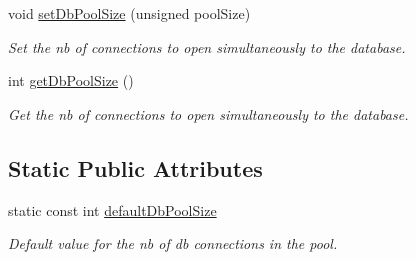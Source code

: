 \begin{DoxyCompactItemize}
void \hyperlink{classDbConfiguration_a188e9fb2d8159963d36fe07892ab6413}{setDbPoolSize} (unsigned poolSize)
\begin{DoxyCompactList}\small\item\em Set the nb of connections to open simultaneously to the database. \item\end{DoxyCompactList}\item 
int \hyperlink{classDbConfiguration_a4f4b6838ef282481d47f8b332c4da598}{getDbPoolSize} ()
\begin{DoxyCompactList}\small\item\em Get the nb of connections to open simultaneously to the database. \item\end{DoxyCompactList}\end{DoxyCompactItemize}
\subsection*{Static Public Attributes}
\begin{DoxyCompactItemize}
\item 
\hypertarget{classDbConfiguration_ad8dfa863efbd93a229f7371e4c5ea2c2}{
static const int \hyperlink{classDbConfiguration_ad8dfa863efbd93a229f7371e4c5ea2c2}{defaultDbPoolSize}}
\label{classDbConfiguration_ad8dfa863efbd93a229f7371e4c5ea2c2}

\begin{DoxyCompactList}\small\item\em Default value for the nb of db connections in the pool. \item\end{DoxyCompactList}\end{DoxyCompactItemize}
